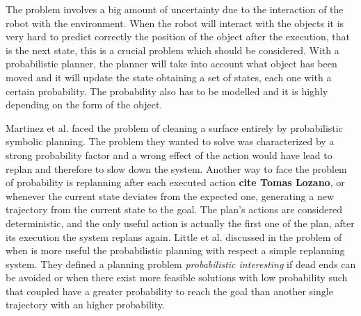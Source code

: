 The problem involves a big amount of uncertainty due to the interaction of the robot with the environment. When the robot will interact with the objects it is very hard to predict correctly the position of the object after the execution, that is the next state, this is a crucial problem which should be considered. With a probabilistic planner, the planner will take into account what object has been moved and it will update the state obtaining a set of states, each one with a certain probability. The probability also has to be modelled and it is highly depending on the form of the object.

Martinez et al. \citep{martinez2015planning} faced the problem of cleaning a surface entirely by probabilistic symbolic planning. The problem they wanted to solve was characterized by a strong probability factor and a wrong effect of the action would have lead to replan and therefore to slow down the system.
Another way to face the problem of probability is replanning after each executed action \textbf{cite Tomas Lozano}, or whenever the current state deviates from the expected one, generating a new trajectory from the current state to the goal. The plan's actions are considered deterministic, and the only useful action is actually the first one of the plan, after its execution the system replans again. Little et al. discussed in \cite{little2007probabilistic} the problem of when is more useful the probabilistic planning with respect a simple replanning system. 
They defined a planning problem \textit{probabilistic interesting} if dead ends can be avoided or when there exist more feasible solutions with low probability such that coupled have a greater probability to reach the goal than another single trajectory with an higher probability.

